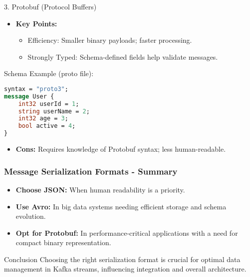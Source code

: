\documentclass[aspectratio=169]{beamer}
\begin{document}
\begin{frame}[fragile]
\begin{block}{3. Protobuf (Protocol Buffers)}
        \begin{itemize}
            \item \textbf{Key Points:}
            \begin{itemize}
                \item Efficiency: Smaller binary payloads; faster processing.
                \item Strongly Typed: Schema-defined fields help validate messages.
            \end{itemize}
        \end{itemize}
        
        \begin{block}{Schema Example (proto file):}
            \begin{lstlisting}[language=protobuf]
syntax = "proto3";
message User {
    int32 userId = 1;
    string userName = 2;
    int32 age = 3;
    bool active = 4;
}
            \end{lstlisting}
        \end{block}
        
        \begin{itemize}
            \item \textbf{Cons:} Requires knowledge of Protobuf syntax; less human-readable.
        \end{itemize}
    \end{block}
\end{frame}

\begin{frame}[fragile]
    \frametitle{Message Serialization Formats - Summary}
    \begin{itemize}
        \item \textbf{Choose JSON:} When human readability is a priority.
        \item \textbf{Use Avro:} In big data systems needing efficient storage and schema evolution.
        \item \textbf{Opt for Protobuf:} In performance-critical applications with a need for compact binary representation.
    \end{itemize}
    
    \begin{block}{Conclusion}
        Choosing the right serialization format is crucial for optimal data management in Kafka streams, influencing integration and overall architecture.
    \end{block}
\end{frame}
\end{document}
